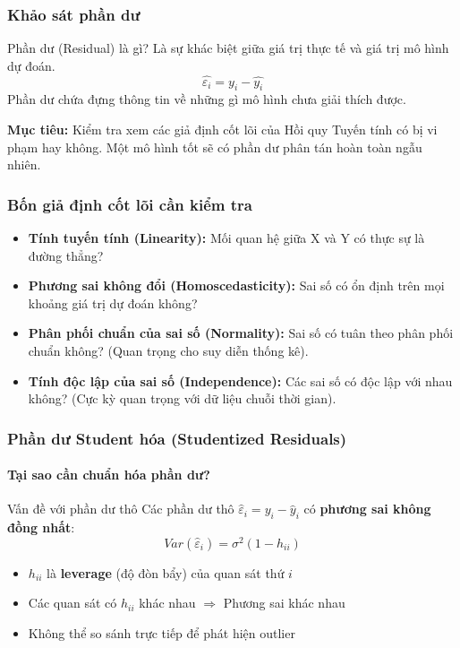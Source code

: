 \begin{frame}
    \frametitle{Khảo sát phần dư }
    \begin{block}{Phần dư (Residual) là gì?}
        Là sự khác biệt giữa giá trị thực tế và giá trị mô hình dự đoán.
        \[ \widehat{\varepsilon_i} = y_i - \widehat{y_i} \]
        Phần dư chứa đựng thông tin về những gì mô hình chưa giải thích được.
    \end{block}
    
    \textbf{Mục tiêu:} Kiểm tra xem các giả định cốt lõi của Hồi quy Tuyến tính có bị vi phạm hay không. Một mô hình tốt sẽ có phần dư phân tán hoàn toàn ngẫu nhiên.
\end{frame}

\begin{frame}
    \frametitle{Bốn giả định cốt lõi cần kiểm tra}
    \begin{itemize}
        \item<1-> \textbf{Tính tuyến tính (Linearity):} Mối quan hệ giữa X và Y có thực sự là đường thẳng?
        
        \item<2-> \textbf{Phương sai không đổi (Homoscedasticity):} Sai số có ổn định trên mọi khoảng giá trị dự đoán không?
        
        \item<3-> \textbf{Phân phối chuẩn của sai số (Normality):} Sai số có tuân theo phân phối chuẩn không? (Quan trọng cho suy diễn thống kê).
        
        \item<4-> \textbf{Tính độc lập của sai số (Independence):} Các sai số có độc lập với nhau không? (Cực kỳ quan trọng với dữ liệu chuỗi thời gian).
    \end{itemize}
\end{frame}

\begin{frame}
    \frametitle{Phần dư Student hóa (Studentized Residuals)}
    \framesubtitle{Tại sao cần chuẩn hóa phần dư?}
    
    \begin{block}{Vấn đề với phần dư thô}
        Các phần dư thô $\widehat{\varepsilon}_i = y_i - \widehat{y}_i$ có \textbf{phương sai không đồng nhất}:
        \[
        Var(\widehat{\varepsilon}_i) = \sigma^2(1 - h_{ii})
        \]
        
        \begin{itemize}
            \item $h_{ii}$ là \textbf{leverage} (độ đòn bẩy) của quan sát thứ $i$\footnotemark
            \item Các quan sát có $h_{ii}$ khác nhau $\Rightarrow$ Phương sai khác nhau
            \item Không thể so sánh trực tiếp để phát hiện outlier
        \end{itemize}
    \end{block}
\end{frame}

